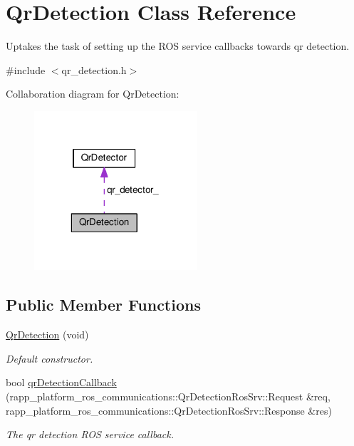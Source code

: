 \hypertarget{classQrDetection}{\section{Qr\-Detection Class Reference}
\label{classQrDetection}
}


Uptakes the task of setting up the R\-O\-S service callbacks towards qr detection.  




{\ttfamily \#include $<$qr\-\_\-detection.\-h$>$}



Collaboration diagram for Qr\-Detection\-:
\nopagebreak
\begin{figure}[H]
\begin{center}
\leavevmode
\includegraphics[width=172pt]{classQrDetection__coll__graph}
\end{center}
\end{figure}
\subsection*{Public Member Functions}
\begin{DoxyCompactItemize}
\item 
\hyperlink{classQrDetection_a97890b1548487ff8660924821a7e0e1f}{Qr\-Detection} (void)
\begin{DoxyCompactList}\small\item\em Default constructor. \end{DoxyCompactList}\item 
bool \hyperlink{classQrDetection_a9e81b97a3acc36caa03c2241d649704b}{qr\-Detection\-Callback} (rapp\-\_\-platform\-\_\-ros\-\_\-communications\-::\-Qr\-Detection\-Ros\-Srv\-::\-Request \&req, rapp\-\_\-platform\-\_\-ros\-\_\-communications\-::\-Qr\-Detection\-Ros\-Srv\-::\-Response \&res)
\begin{DoxyCompactList}\small\item\em The qr detection R\-O\-S service callback. \end{DoxyCompactList}\end{DoxyCompactItemize}
